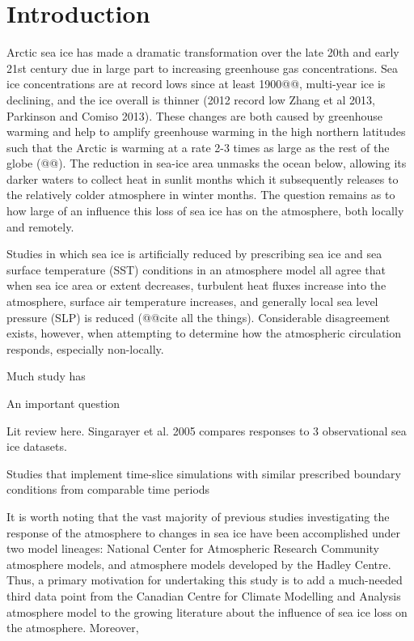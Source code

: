 \documentclass[twocol]{ametsoc}
\begin{document}

\section{Introduction}

Arctic sea ice has made a dramatic transformation over the late 20th and early 21st century due in large part to increasing greenhouse gas concentrations. Sea ice concentrations are at record lows since at least 1900@@, multi-year ice is declining, and the ice overall is thinner (2012 record low Zhang et al 2013, Parkinson and Comiso 2013). These changes are both caused by greenhouse warming and help to amplify greenhouse warming in the high northern latitudes such that the Arctic is warming at a rate 2-3 times as large as the rest of the globe (@@). The reduction in sea-ice area unmasks the ocean below, allowing its darker waters to collect heat in sunlit months which it subsequently releases to the relatively colder atmosphere in winter months. The question remains as to how large of an influence this loss of sea ice has on the atmosphere, both locally and remotely. %

Studies in which sea ice is artificially reduced by prescribing sea ice and sea surface temperature (SST) conditions in an atmosphere model all agree that when sea ice area or extent decreases, turbulent heat fluxes increase into the atmosphere, surface air temperature increases, and generally local sea level pressure (SLP) is reduced (@@cite all the things). Considerable disagreement exists, however, when attempting to determine how the atmospheric circulation responds, especially non-locally. 

Much study has 

An important question

Lit review here. Singarayer et al. 2005 compares responses to 3 observational sea ice datasets.

Studies that implement time-slice simulations with similar prescribed boundary conditions from comparable time periods 

It is worth noting that the vast majority of previous studies investigating the response of the atmosphere to changes in sea ice have been accomplished under two model lineages: National Center for Atmospheric Research Community atmosphere models, and atmosphere models developed by the Hadley Centre. Thus, a primary motivation for undertaking this study is to add a much-needed third data point from the Canadian Centre for Climate Modelling and Analysis atmosphere model to the growing literature about the influence of sea ice loss on the atmosphere. Moreover, 
\end{document}

